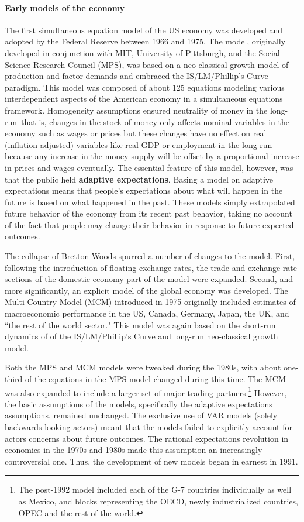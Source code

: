 \documentclass[a4paper]{article}\usepackage{graphicx, color}
\begin{document}
\paragraph{Early models of the economy}
The first simultaneous equation model of the US economy was developed and adopted by the Federal Reserve between 1966 and 1975. The model, originally developed in conjunction with MIT, University of Pittsburgh, and the Social Science Research Council (MPS), was based on a neo-classical growth model of production and factor demands and embraced the IS/LM/Phillip's Curve paradigm. This model was composed of about 125 equations modeling various interdependent aspects of the American economy in a simultaneous equations framework. Homogeneity assumptions ensured neutrality of money in the long-run--that is, changes in the stock of money only affects nominal variables in the economy such as wages or prices but these changes have no effect on real (inflation adjusted) variables like real GDP or employment in the long-run because any increase in the money supply will be offset by a proportional increase in prices and wages eventually. The essential feature of this model, however, was that the public held {\bf{adaptive expectations}}. Basing a model on adaptive expectations means that people's expectations about what will happen in the future is based on what happened in the past. These models simply extrapolated future behavior of the economy from its recent past behavior, taking no account of the fact that people may change their behavior in response to future expected outcomes.

The collapse of Bretton Woods spurred a number of changes to the model. First, following the introduction of floating exchange rates, the trade and exchange rate sections of the domestic economy part of the model were expanded. Second, and more significantly, an explicit model of the global economy was developed. The Multi-Country Model (MCM) introduced in 1975 originally included estimates of macroeconomic performance in the US, Canada, Germany, Japan, the UK, and ``the rest of the world sector." This model was again based on the short-run dynamics of of the IS/LM/Phillip's Curve and long-run neo-classical growth model.

Both the MPS and MCM models were tweaked during the 1980s, with about one-third of the equations in the MPS model changed during this time. The MCM was also expanded to include a larger set of major trading partners.\footnote{The post-1992 model included each of the G-7 countries individually as well as Mexico, and blocks representing the OECD, newly industrialized countries, OPEC and the rest of the world.} However, the basic assumptions of the models, specifically the adaptive expectations assumptions, remained unchanged. The exclusive use of VAR models (solely backwards looking actors) meant that the models failed to explicitly account for actors concerns about future outcomes. The rational expectations revolution in economics in the 1970s and 1980s made this assumption an increasingly controversial one. Thus, the development of new models began in earnest in 1991.
 
\end{document}
